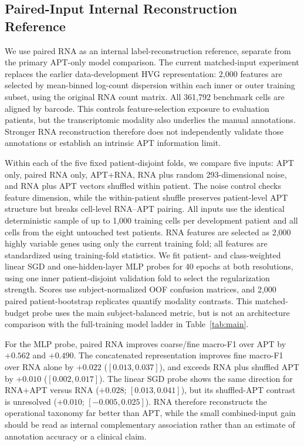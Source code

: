 \documentclass{article} %
\begin{document}
\subsection{Paired-Input Internal Reconstruction Reference}
\label{sec:appendix:paired_rna_oracle}

We use paired RNA as an internal label-reconstruction reference, separate from
the primary APT-only model comparison. The current matched-input experiment
replaces the earlier data-development HVG representation: 2{,}000 features
are selected by mean-binned log-count dispersion within each inner or outer
training subset, using the original RNA count matrix. All 361{,}792 benchmark
cells are aligned by barcode. This controls feature-selection exposure to
evaluation patients, but the transcriptomic modality also underlies the manual
annotations. Stronger RNA reconstruction therefore does not independently
validate those annotations or establish an intrinsic APT information limit.

Within each of the five fixed patient-disjoint folds, we compare five inputs:
APT only, paired RNA only, APT+RNA, RNA plus random 293-dimensional noise, and
RNA plus APT vectors shuffled within patient. The noise control checks feature
dimension, while the within-patient shuffle preserves patient-level APT
structure but breaks cell-level RNA--APT pairing. All inputs use the identical
deterministic sample of up to 1{,}000 training cells per development patient
and all cells from the eight untouched test patients. RNA features are selected
as 2{,}000 highly variable genes using only the current training fold; all
features are standardized using training-fold statistics. We fit patient- and
class-weighted linear SGD and one-hidden-layer MLP probes for 40 epochs at both
resolutions, using one inner patient-disjoint validation fold to select the
regularization strength. Scores use subject-normalized OOF confusion matrices,
and 2{,}000 paired patient-bootstrap replicates quantify modality contrasts.
This matched-budget probe uses the main subject-balanced metric, but is not
an architecture comparison with the full-training model ladder in
Table~\ref{tab:main}.



For the MLP probe, paired RNA improves coarse/fine macro-F1 over APT by
$+0.562$ and $+0.490$. The concatenated representation improves fine macro-F1
over RNA alone by $+0.022$ ($[0.013,0.037]$), and exceeds RNA plus shuffled APT
by $+0.010$ ($[0.002,0.017]$). The linear SGD probe shows the same direction
for RNA+APT versus RNA ($+0.028$; $[0.013,0.041]$), but its shuffled-APT
contrast is unresolved ($+0.010$; $[-0.005,0.025]$). RNA therefore reconstructs
the operational taxonomy far better than APT, while the small combined-input
gain should be read as internal complementary association rather than an
estimate of annotation accuracy or a clinical claim.
\end{document}

